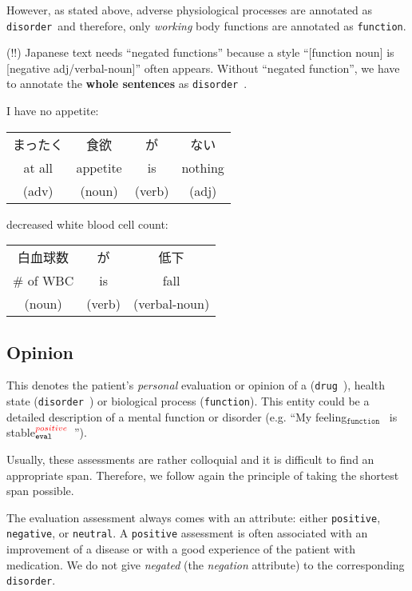 \documentclass[12pt]{article}
\theoremstyle{definition}
\newcommand{\disorder}[1]{\colorbox{fuchsia}{\textcolor{white}{#1$_{\texttt{disorder}}$}}\ }
\newcommand{\function}[1]{\colorbox{banana}{#1$_{\texttt{function}}$}\ }
\newcommand{\evalPos}[1]{\colorbox{babyblue}{#1$_{\texttt{eval}}^{\textcolor{red}{positive}}$}\ }
\newcommand{\evalNeg}[1]{\colorbox{babyblue}{#1$_{\texttt{eval}}^{\textcolor{red}{negative}}$}\ }
\newcommand{\dis}{\texttt{disorder}\ }
\newcommand{\dr}{\texttt{drug}\ }
\begin{document}
However, as stated above, adverse physiological processes are annotated as \dis and therefore, only \emph{working} body functions are annotated as \texttt{function}.
{\color{red}
(!!) Japanese text needs ``negated functions'' because a style ``[function noun] is [negative adj/verbal-noun]'' often appears.
Without ``negated function'', we have to annotate the \textbf{whole sentences} as \dis.
\bigskip

I have no appetite: 
\begin{tabular}{c|c|c|c}
    まったく & 食欲 & が & ない \\
    at all & appetite & is & nothing \\
    (adv) & (noun) & (verb) & (adj) \\
\end{tabular}\bigskip

decreased white blood cell count: 
\begin{tabular}{c|c|c}
    白血球数 & が & 低下 \\
    \# of WBC & is & fall \\
    (noun) & (verb) & (verbal-noun) \\
\end{tabular}

}

\subsection{Opinion} \label{ent_eval}
This denotes the patient's \textit{personal} evaluation or opinion of a (\dr), health state (\dis) or biological process (\texttt{function}).
This entity could be a detailed description of a mental function or disorder (e.g. ``My \function{feeling} is \evalPos{stable}'').


Usually, these assessments are rather colloquial and it is difficult to find an appropriate span.
Therefore, we follow again the principle of taking the shortest span possible.

The evaluation assessment always comes with an attribute: either \texttt{positive}, \texttt{negative}, or \texttt{neutral}.
A \texttt{positive} assessment is often associated with an improvement of a disease or with a good experience of the patient with medication.
We do not give \textit{negated} (the \textit{negation} attribute) to the corresponding \texttt{disorder}.
\end{document}
